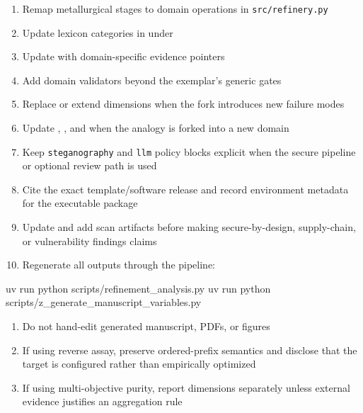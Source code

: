 \documentclass[
  english,
]{article}
\newenvironment{Shaded}{}{}
\newcommand{\ExtensionTok}[1]{#1}
\newcommand{\NormalTok}[1]{#1}
\providecommand{\tightlist}{%
  \setlength{\itemsep}{0pt}\setlength{\parskip}{0pt}}
\begin{document}
\begin{enumerate}
\def\labelenumi{\arabic{enumi}.}
\tightlist
\item
  Remap metallurgical stages to domain operations in
  \texttt{src/refinery.py}
\item
  Update lexicon categories in  under
\item
  Update  with domain-specific evidence
  pointers
\item
  Add domain validators beyond the exemplar's generic gates
\item
  Replace or extend  dimensions when the fork
  introduces new failure modes
\item
  Update , ,
  and  when the analogy is forked
  into a new domain
\item
  Keep \texttt{steganography} and \texttt{llm} policy blocks explicit
  when the secure pipeline or optional review path is used
\item
  Cite the exact template/software release and record environment
  metadata for the executable package
\item
  Update  and add scan
  artifacts before making secure-by-design, supply-chain, or
  vulnerability findings claims
\item
  Regenerate all outputs through the pipeline:
\end{enumerate}

\begin{Shaded}
\begin{Highlighting}[]
\ExtensionTok{uv}\NormalTok{ run python scripts/refinement\_analysis.py}
\ExtensionTok{uv}\NormalTok{ run python scripts/z\_generate\_manuscript\_variables.py}
\end{Highlighting}
\end{Shaded}

\begin{enumerate}
\def\labelenumi{\arabic{enumi}.}
\setcounter{enumi}{10}
\tightlist
\item
  Do not hand-edit generated manuscript, PDFs, or figures
\item
  If using reverse assay, preserve ordered-prefix semantics and disclose
  that the target is configured rather than empirically optimized
\item
  If using multi-objective purity, report dimensions separately unless
  external evidence justifies an aggregation rule
\end{enumerate}
\end{document}
